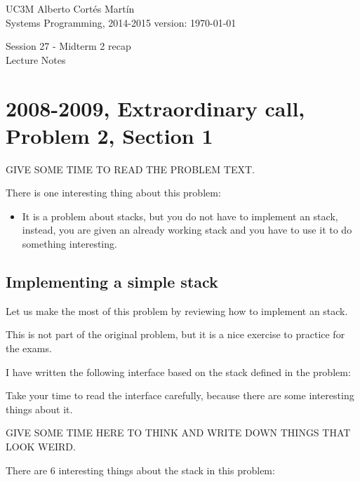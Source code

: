\documentclass[a4paper, 9pt]{extarticle}
\newcommand{\realtitle}{Session 27 - Midterm 2 recap}
\begin{document}
\makebox[\linewidth]{\rule{\textwidth}{0.4pt}}
UC3M \hfill Alberto Cortés Martín\\
Systems Programming, 2014-2015 \hfill version: \today\\
\makebox[\linewidth]{\rule{\textwidth}{0.4pt}}
\begin{center}
  \Large{\realtitle}\\Lecture Notes
\end{center}
\makebox[\linewidth]{\rule{\textwidth}{0.4pt}}
\vspace{1cm}

\section{2008-2009, Extraordinary call, Problem 2, Section 1}

GIVE SOME TIME TO READ THE PROBLEM TEXT.

There is one interesting thing about this problem:

\begin{itemize}

  \item It is a problem about stacks, but you do not have to implement an stack,
    instead, you are given an already working stack and you
    have to use it to do something interesting.

\end{itemize}


\subsection{Implementing a simple stack}

Let us make the most of this problem by reviewing how to implement an stack.

This is not part of the original problem, but it is a nice exercise to practice
for the exams.

I have written the following interface based on the stack defined in the problem:


Take your time to read the interface carefully, because there are some
interesting things about it.

GIVE SOME TIME HERE TO THINK AND WRITE DOWN THINGS THAT LOOK WEIRD.

There are 6 interesting things about the stack in this problem:
\end{document}
